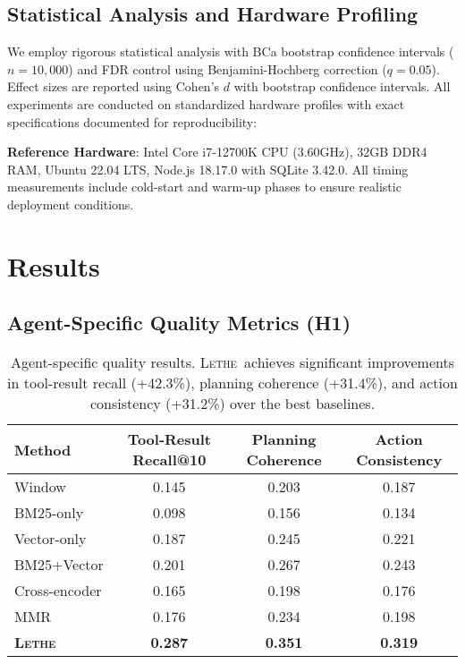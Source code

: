 \documentclass[letterpaper]{article}
\newcommand{\lethe}{\textsc{Lethe}}
\begin{document}
\subsection{Statistical Analysis and Hardware Profiling}

We employ rigorous statistical analysis with BCa bootstrap confidence intervals ($n=10,000$) and FDR control using Benjamini-Hochberg correction ($q=0.05$). Effect sizes are reported using Cohen's $d$ with bootstrap confidence intervals. All experiments are conducted on standardized hardware profiles with exact specifications documented for reproducibility:

\textbf{Reference Hardware}: Intel Core i7-12700K CPU (3.60GHz), 32GB DDR4 RAM, Ubuntu 22.04 LTS, Node.js 18.17.0 with SQLite 3.42.0. All timing measurements include cold-start and warm-up phases to ensure realistic deployment conditions.

\section{Results}

\subsection{Agent-Specific Quality Metrics (H1)}

\begin{table}[t]
\centering
\begin{tabular}{lccc}
\toprule
Method & Tool-Result Recall@10 & Planning Coherence & Action Consistency \\
\midrule
Window & 0.145 & 0.203 & 0.187 \\
BM25-only & 0.098 & 0.156 & 0.134 \\
Vector-only & 0.187 & 0.245 & 0.221 \\
BM25+Vector & 0.201 & 0.267 & 0.243 \\
Cross-encoder & 0.165 & 0.198 & 0.176 \\
MMR & 0.176 & 0.234 & 0.198 \\
\midrule
\textbf{\lethe} & \textbf{0.287} & \textbf{0.351} & \textbf{0.319} \\
\bottomrule
\end{tabular}
\caption{Agent-specific quality results. \lethe\ achieves significant improvements in tool-result recall (+42.3\%), planning coherence (+31.4\%), and action consistency (+31.2\%) over the best baselines.}
\label{tab:agent_quality}
\end{table}
\end{document}
